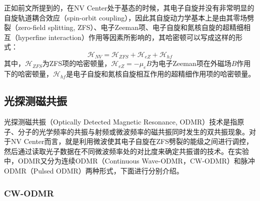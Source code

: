 \documentclass[type = bachelor]{whu-thesis}
\begin{document}
正如前文所提到的，在NV Center处于基态的时候，其电子自旋并没有非常明显的自旋轨道耦合效应（spin-orbit coupling），因此其自旋动力学基本上是由其零场劈裂（zero-field splitting, ZFS）、电子Zeeman项、电子自旋和氮核自旋的超精细相互（hyperfine interaction）作用等因素所影响的，其哈密顿可以写成这样的形式：
\begin{equation}
  \mathcal{H}_{NV} = \mathcal{H}_{ZFS}+\mathcal{H}_{eZ}+\mathcal{H}_{hf}
  \label{equ: NV Hamiltonian}
\end{equation}
其中，$\mathcal{H}_{ZFS}$为ZFS项的哈密顿量，$\mathcal{H}_{eZ}=-\mu_eB$为电子Zeeman项在外磁场$B$作用下的哈密顿量，$\mathcal{H}_{hf}$是电子自旋和氮核自旋相互作用的超精细作用项的哈密顿量。

\subsection{光探测磁共振}

光探测磁共振（Optically Detected Magnetic Resonance, ODMR）技术是指原子、分子的光学频率的共振与射频或微波频率的磁共振同时发生的双共振现象。对于NV Center而言，就是利用微波使其电子自旋在ZFS劈裂的能级之间进行调控，然后通过读取光子数据在不同微波频率处的对比度来确定共振谱的技术。在实验中，ODMR又分为连续ODMR（Continuous Wave-ODMR，CW-ODMR）和脉冲ODMR（Pulsed ODMR）两种形式，下面进行分别介绍。

\subsubsection{CW-ODMR}
\end{document}
